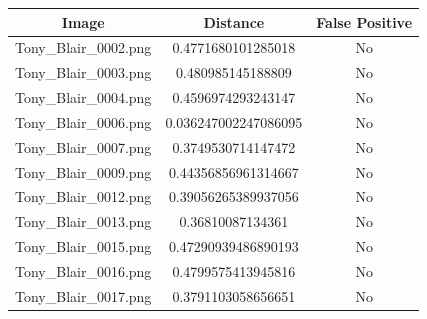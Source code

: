 \documentclass[12pt]{article}
\begin{document}
\begin{center}
\begin{tabular}{ccc}
Image & Distance & False Positive \\
\hline
Tony\_Blair\_0002.png & 0.4771680101285018 & No \\
Tony\_Blair\_0003.png & 0.480985145188809 & No\\
Tony\_Blair\_0004.png & 0.4596974293243147 & No\\
Tony\_Blair\_0006.png & 0.036247002247086095 & No\\
Tony\_Blair\_0007.png & 0.3749530714147472 & No\\
Tony\_Blair\_0009.png & 0.44356856961314667 & No\\
Tony\_Blair\_0012.png & 0.39056265389937056 & No\\
Tony\_Blair\_0013.png & 0.36810087134361 & No\\
Tony\_Blair\_0015.png & 0.47290939486890193 & No\\
Tony\_Blair\_0016.png & 0.4799575413945816 & No\\
Tony\_Blair\_0017.png & 0.3791103058656651 & No\\
\end{tabular}


\end{center}
\end{document}
